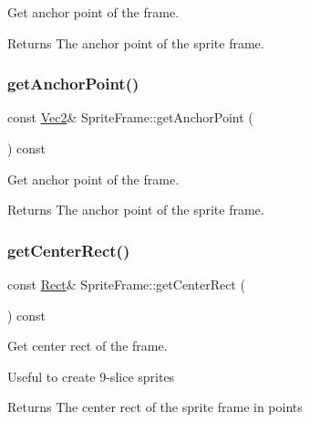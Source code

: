 Get anchor point of the frame.

\begin{DoxyReturn}{Returns}
The anchor point of the sprite frame. 
\end{DoxyReturn}
\mbox{\label{classSpriteFrame_a3c5048e43ffe077820fd4814b6576371}} 
\subsubsection{\texorpdfstring{get\+Anchor\+Point()}{getAnchorPoint()}\hspace{0.1cm}{\footnotesize\ttfamily [2/2]}}
{\footnotesize\ttfamily const \hyperlink{classVec2}{Vec2}\& Sprite\+Frame\+::get\+Anchor\+Point (\begin{DoxyParamCaption}{ }\end{DoxyParamCaption}) const}

Get anchor point of the frame.

\begin{DoxyReturn}{Returns}
The anchor point of the sprite frame. 
\end{DoxyReturn}
\mbox{\label{classSpriteFrame_a44d76b70a07458fd0e0917182f9feca7}} 
\subsubsection{\texorpdfstring{get\+Center\+Rect()}{getCenterRect()}}
{\footnotesize\ttfamily const \hyperlink{classRect}{Rect}\& Sprite\+Frame\+::get\+Center\+Rect (\begin{DoxyParamCaption}{ }\end{DoxyParamCaption}) const\hspace{0.3cm}{\ttfamily [inline]}}

Get center rect of the frame.

Useful to create 9-\/slice sprites

\begin{DoxyReturn}{Returns}
The center rect of the sprite frame in points 
\end{DoxyReturn}
\mbox{\label{classSpriteFrame_a12d2d4aaa5c628e3df3e5aaa4750c6c0}} 
